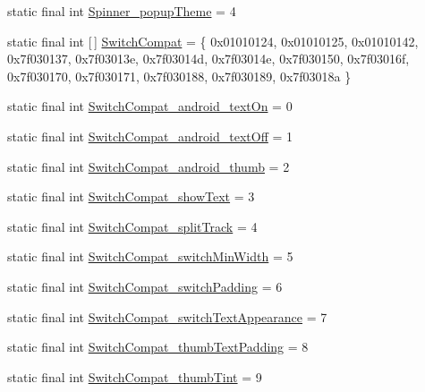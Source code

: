 \begin{DoxyCompactItemize}
\item 
static final int \mbox{\hyperlink{classandroid_1_1support_1_1design_1_1R_1_1styleable_a6ca303c6731fcf4e6937395aaf5ddf89}{Spinner\+\_\+popup\+Theme}} = 4
\item 
static final int \mbox{[}$\,$\mbox{]} \mbox{\hyperlink{classandroid_1_1support_1_1design_1_1R_1_1styleable_a7389a923bf3e321b6b5d10b0589547a1}{Switch\+Compat}} = \{ 0x01010124, 0x01010125, 0x01010142, 0x7f030137, 0x7f03013e, 0x7f03014d, 0x7f03014e, 0x7f030150, 0x7f03016f, 0x7f030170, 0x7f030171, 0x7f030188, 0x7f030189, 0x7f03018a \}
\item 
static final int \mbox{\hyperlink{classandroid_1_1support_1_1design_1_1R_1_1styleable_a24a13a92821889139973436085501029}{Switch\+Compat\+\_\+android\+\_\+text\+On}} = 0
\item 
static final int \mbox{\hyperlink{classandroid_1_1support_1_1design_1_1R_1_1styleable_a837987a3c039d6ff4cbd72571612d0ee}{Switch\+Compat\+\_\+android\+\_\+text\+Off}} = 1
\item 
static final int \mbox{\hyperlink{classandroid_1_1support_1_1design_1_1R_1_1styleable_a3516d26bd8d9a81bed9002886aa07d91}{Switch\+Compat\+\_\+android\+\_\+thumb}} = 2
\item 
static final int \mbox{\hyperlink{classandroid_1_1support_1_1design_1_1R_1_1styleable_ae6616c97ccaecf4606cb96741dd3b9f7}{Switch\+Compat\+\_\+show\+Text}} = 3
\item 
static final int \mbox{\hyperlink{classandroid_1_1support_1_1design_1_1R_1_1styleable_a0a8d5373c3e616fc33bdb6114eecb2b2}{Switch\+Compat\+\_\+split\+Track}} = 4
\item 
static final int \mbox{\hyperlink{classandroid_1_1support_1_1design_1_1R_1_1styleable_a56e625abaf81738acd70ecb9b67e92e4}{Switch\+Compat\+\_\+switch\+Min\+Width}} = 5
\item 
static final int \mbox{\hyperlink{classandroid_1_1support_1_1design_1_1R_1_1styleable_a3fc77e330ad9d708010efc7cab9dfe4a}{Switch\+Compat\+\_\+switch\+Padding}} = 6
\item 
static final int \mbox{\hyperlink{classandroid_1_1support_1_1design_1_1R_1_1styleable_a44eafdc77c077afb0a4a7f61a4361bed}{Switch\+Compat\+\_\+switch\+Text\+Appearance}} = 7
\item 
static final int \mbox{\hyperlink{classandroid_1_1support_1_1design_1_1R_1_1styleable_aaa78829f09f5da58830c4fd391b6e65c}{Switch\+Compat\+\_\+thumb\+Text\+Padding}} = 8
\item 
static final int \mbox{\hyperlink{classandroid_1_1support_1_1design_1_1R_1_1styleable_af29c0a9e2e39229c9008ddf122250050}{Switch\+Compat\+\_\+thumb\+Tint}} = 9

\end{DoxyCompactItemize}
